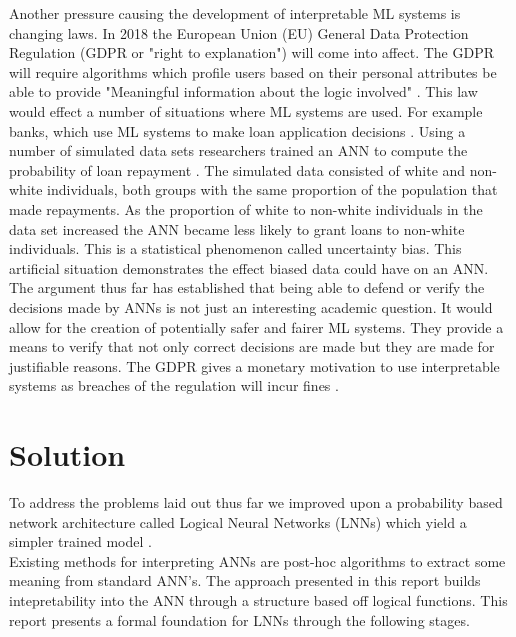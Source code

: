 Another pressure causing the development of interpretable ML systems is changing laws. In 2018 the European Union (EU) General Data Protection Regulation (GDPR or "right to explanation") will come into affect. The GDPR will require algorithms which profile users based on their personal attributes be able to provide "Meaningful information about the logic involved"  \cite{eu-dgpr}. This law would effect a number of situations where ML systems are used. For example banks, which use ML systems to make loan application decisions \cite{goodman2016european}. Using a number of simulated data sets researchers trained an ANN to compute the probability of loan repayment \cite{goodman2016european}. The simulated data consisted of white and non-white individuals, both groups with the same proportion of the population that made repayments. As the proportion of white to non-white individuals in the data set increased the ANN became less likely to grant loans to non-white individuals. This is a statistical phenomenon called uncertainty bias. This artificial situation demonstrates the effect biased data could have on an ANN.\\

The argument thus far has established that being able to defend or verify the decisions made by ANNs is not just an interesting academic question. It would allow for the creation of potentially safer and fairer ML systems. They provide a means to verify that not only correct decisions are made but they are made for justifiable reasons. The GDPR gives a monetary motivation to use interpretable systems as breaches of the regulation will incur fines \cite{goodman2016european}.\\

\section{Solution}
To address the problems laid out thus far we improved upon a probability based network architecture called Logical Neural Networks (LNNs) which yield a simpler trained model \cite{LearningLogicalActivations}.\\

Existing methods for interpreting ANNs are post-hoc algorithms to extract some meaning from standard ANN's. The approach presented in this report builds intepretability into the ANN through a structure based off logical functions. This report presents a formal foundation for LNNs through the following stages.

